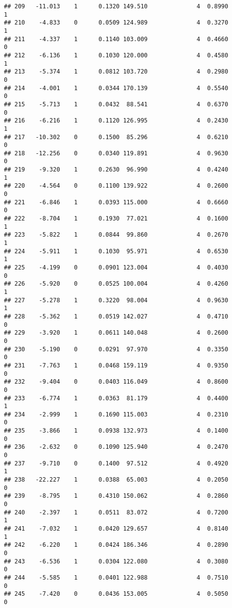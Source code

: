 \documentclass[
]{article}
\begin{document}
\begin{verbatim}
## 209   -11.013    1      0.1320 149.510              4  0.8990      1
## 210    -4.833    0      0.0509 124.989              4  0.3270      1
## 211    -4.337    1      0.1140 103.009              4  0.4660      0
## 212    -6.136    1      0.1030 120.000              4  0.4580      1
## 213    -5.374    1      0.0812 103.720              4  0.2980      0
## 214    -4.001    1      0.0344 170.139              4  0.5540      0
## 215    -5.713    1      0.0432  88.541              4  0.6370      0
## 216    -6.216    1      0.1120 126.995              4  0.2430      1
## 217   -10.302    0      0.1500  85.296              4  0.6210      0
## 218   -12.256    0      0.0340 119.891              4  0.9630      0
## 219    -9.320    1      0.2630  96.990              4  0.4240      1
## 220    -4.564    0      0.1100 139.922              4  0.2600      0
## 221    -6.846    1      0.0393 115.000              4  0.6660      0
## 222    -8.704    1      0.1930  77.021              4  0.1600      1
## 223    -5.822    1      0.0844  99.860              4  0.2670      1
## 224    -5.911    1      0.1030  95.971              4  0.6530      1
## 225    -4.199    0      0.0901 123.004              4  0.4030      0
## 226    -5.920    0      0.0525 100.004              4  0.4260      1
## 227    -5.278    1      0.3220  98.004              4  0.9630      1
## 228    -5.362    1      0.0519 142.027              4  0.4710      0
## 229    -3.920    1      0.0611 140.048              4  0.2600      0
## 230    -5.190    0      0.0291  97.970              4  0.3350      0
## 231    -7.763    1      0.0468 159.119              4  0.9350      0
## 232    -9.404    0      0.0403 116.049              4  0.8600      0
## 233    -6.774    1      0.0363  81.179              4  0.4400      1
## 234    -2.999    1      0.1690 115.003              4  0.2310      0
## 235    -3.866    1      0.0938 132.973              4  0.1400      0
## 236    -2.632    0      0.1090 125.940              4  0.2470      0
## 237    -9.710    0      0.1400  97.512              4  0.4920      1
## 238   -22.227    1      0.0388  65.003              4  0.2050      0
## 239    -8.795    1      0.4310 150.062              4  0.2860      0
## 240    -2.397    1      0.0511  83.072              4  0.7200      1
## 241    -7.032    1      0.0420 129.657              4  0.8140      1
## 242    -6.220    1      0.0424 186.346              4  0.2890      0
## 243    -6.536    1      0.0304 122.080              4  0.3080      0
## 244    -5.585    1      0.0401 122.988              4  0.7510      0
## 245    -7.420    0      0.0436 153.005              4  0.5050      0

\end{verbatim}
\end{document}
